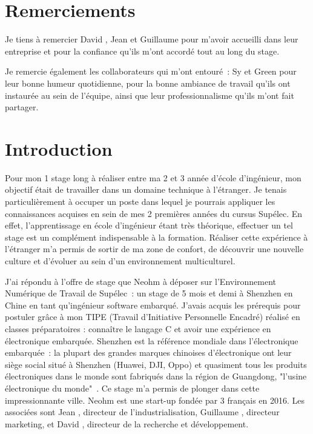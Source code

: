 \documentclass[a4paper, 12pt, sffamily]{report}
\begin{document}
\renewcommand{\contentsname}{Sommaire} %

\tableofcontents

\chapter*{Remerciements}

Je tiens à remercier David , Jean  et Guillaume  pour m’avoir accueilli dans leur entreprise et pour la confiance qu'ils m'ont accordé tout au long du stage.

Je remercie également les collaborateurs qui m’ont entouré~: Sy et Green pour leur bonne humeur quotidienne, pour la bonne ambiance de travail qu’ils ont instaurée au sein de l'équipe, ainsi que leur professionnalisme qu’ils m’ont fait partager.

\chapter{Introduction}
Pour mon 1\ier{} stage long à réaliser entre ma 2\ieme{} et 3\ieme{} année d’école d’ingénieur, mon objectif était de travailler dans un domaine technique à l’étranger. Je tenais particulièrement à occuper un poste dans lequel je pourrais appliquer les connaissances acquises en sein de mes 2 premières années du cursus Supélec. En effet, l’apprentissage en école d’ingénieur étant très théorique, effectuer un tel stage est un complément indispensable à la formation. Réaliser cette expérience à l'étranger m'a permis de sortir de ma zone de confort, de découvrir une nouvelle culture et d’évoluer au sein d’un environnement multiculturel.

J’ai répondu à l’offre de stage que Neohm à déposer sur l’Environnement Numérique de Travail de Supélec~: un stage de 5 mois et demi à Shenzhen en Chine en tant qu’ingénieur software embarqué. J’avais acquis les prérequis pour postuler grâce à mon TIPE (Travail d'Initiative Personnelle Encadré) réalisé en classes préparatoires : connaître le langage C et avoir une expérience en électronique embarquée. Shenzhen est la référence mondiale dans l’électronique embarquée~: la plupart des grandes marques chinoises d’électronique ont leur siège social situé à Shenzhen (Huawei, DJI, Oppo) et quasiment tous les produits électroniques dans le monde sont fabriqués dans la région de Guangdong, "l'usine électronique du monde"~\cite{article_shenzhen}. Ce stage m’a permis de plonger dans cette impressionnante ville. Neohm est une start-up fondée par 3 français en 2016. Les associées sont Jean , directeur de l’industrialisation, Guillaume , directeur marketing, et David , directeur de la recherche et développement.
\end{document}
